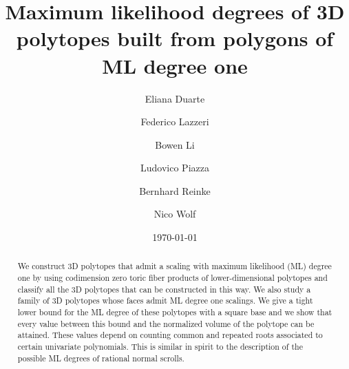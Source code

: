 \documentclass[12pt,reqno]{amsart}   	%
\theoremstyle{plain}
\theoremstyle{definition}
\theoremstyle{remark}
\begin{document}
\title[ML degrees of 3D polytopes built from polygons of ML degree one]{Maximum likelihood degrees of 3D polytopes built from polygons of ML degree one}
\author{Eliana Duarte}
\address{Centro de Matem\'atica da Universidade do Porto (CMUP), Departamento de Matem\'atica, Faculdade de Ci\^encias, Universidade do Porto, Rua do Campo Alegre s/n, 4169-007 Porto, Portugal}

\author{Federico Lazzeri}
\address{Department of Mathematics, KTH Royal Institute of Technology, SE-100 44 Stockholm, Sweden}

\author{Bowen Li}
\address{Department of Mathematics, University of Illinois Urbana-Champaign, 1409 West Green Street, Urbana, IL 61801, USA}

\author{Ludovico Piazza}
\address{Dipartimento di Matematica, Universit\`a di Pisa, Largo Bruno Pontecorvo 5, 56127 Pisa, Italy}

\author{Bernhard Reinke}
\address{Aix-Marseille Universit\'e, CNRS, Institut de Math\'ematiques de Marseille (I2M), Marseille, France}

\author{Nico Wolf}
\address{HTW Berlin -- University of Applied Sciences, Berlin, Germany}
\renewcommand{\shortauthors}{E. Duarte, F. Lazzeri, B. Li, L. Piazza, B. Reinke, N. Wolf}
\date{\today}
\begin{abstract}
We construct 3D polytopes that admit a scaling with maximum likelihood (ML) degree one by using codimension zero toric 
fiber products of lower-dimensional polytopes and classify all the 3D polytopes that can be constructed in this way.
We also study a family of 3D polytopes whose faces admit ML degree one scalings.
We give a tight lower bound for the ML degree of these polytopes with a square base and we show that every value between this bound and
the normalized volume of the polytope can be attained.
These values depend on counting common and repeated roots associated to certain univariate
polynomials. This is similar in spirit to the description of the possible ML degrees of rational normal scrolls.
\end{abstract}

\maketitle
\end{document}
